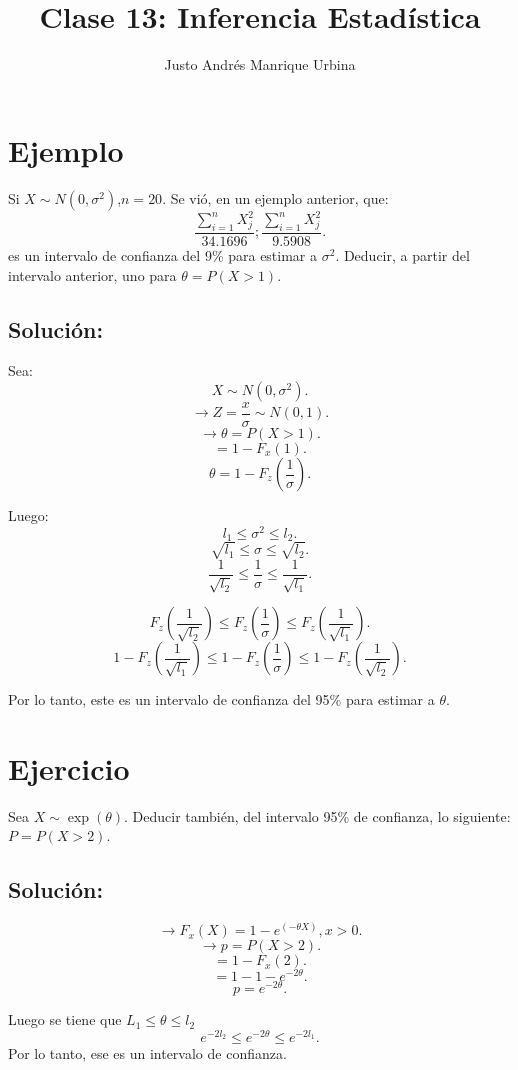 \documentclass{article}
\title{Clase 13: Inferencia Estadística}
\author{Justo Andrés Manrique Urbina}
\begin{document}
\maketitle

\section{Ejemplo}

Si $X\sim N{(0,\sigma^{2})}$,$n=20$. Se vió, en un ejemplo anterior, que:
\[ \frac{\sum_{i=1}^{n}X_{j}^{2}}{34.1696}; \frac{\sum_{i=1}^{n}X_{j}^{2}}{9.5908}.\]
es un intervalo de confianza del 9\% para estimar a $\sigma^{2}$. Deducir, a partir del intervalo anterior, uno para $\theta=P{(X>1)}$.

\subsection{Solución:}
Sea:
\[ X\sim N{(0,\sigma^{2})}.\]
\[ \rightarrow Z=\frac{x}{\sigma} \sim N{(0,1)}.\]
\[ \rightarrow \theta=P{(X>1)}.\]
\[ =1-F_{x}{(1)}.\]
\[ \theta = 1-F_{z}{(\frac{1}{\sigma})}.\]

Luego:
\[ l_{1} \leq \sigma^{2} \leq l_{2}.\]
\[ \sqrt{l_{1}} \leq \sigma \leq \sqrt{l_{2}}.\]
\[ \frac{1}{\sqrt{l_{2}}}\leq \frac{1}{\sigma} \leq \frac{1}{\sqrt{l_1}}.\]

\[ F_{z}{(\frac{1}{\sqrt{l_{2}}})}\leq F_{z}{(\frac{1}{\sigma})}\leq F_{z}{(\frac{1}{\sqrt{l_{1}}})}.\]
\[ 1-F_{z}{(\frac{1}{\sqrt{l_{1}}})}\leq 1-F_{z}{(\frac{1}{\sigma})}\leq 1-F_{z}{(\frac{1}{\sqrt{l_{2}}})}.\]

Por lo tanto, este es un intervalo de confianza del 95\% para estimar a $\theta$.

\section{Ejercicio}
Sea $X\sim \exp{(\theta)}$. Deducir también, del intervalo 95\% de confianza, lo siguiente: $P=P{(X>2)}$.

\subsection{Solución:}

\[ \rightarrow F_{x}{(X)}=1-e^{{(-\theta X)}},x > 0 .\]
\[ \rightarrow p=P{(X>2)}.\]
\[ =1-F_{x}{(2)}.\]
\[ =1-1-e^{-2\theta}.\]
\[ p=e^{-2\theta}.\]

Luego se tiene que $L_{1}\leq \theta \leq l_{2}$
\[ e^{-2l_{2}} \leq e^{-2\theta} \leq e^{-2l_{1}}.\]
Por lo tanto, ese es un intervalo de confianza.
\end{document}
